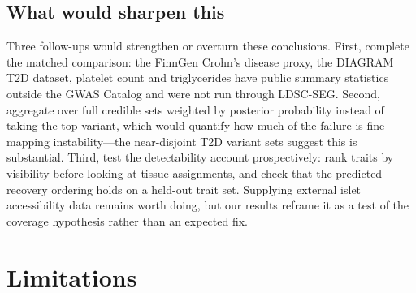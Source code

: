 \documentclass[11pt]{article}
\begin{document}
\subsection*{What would sharpen this}

Three follow-ups would strengthen or overturn these conclusions. First, complete the
matched comparison: the FinnGen Crohn's disease proxy, the DIAGRAM T2D dataset, platelet
count and triglycerides have public summary statistics outside the GWAS Catalog and were
not run through LDSC-SEG. Second,
aggregate over full credible sets weighted by posterior probability instead of taking
the top variant, which would quantify how much of the failure is fine-mapping
instability---the near-disjoint T2D variant sets suggest this is substantial. Third,
test the detectability account prospectively: rank traits by visibility before looking
at tissue assignments, and check that the predicted recovery ordering holds on a held-out
trait set. Supplying external islet accessibility data \citep{chiou2021islet} remains
worth doing, but our results reframe it as a test of the coverage hypothesis rather than
an expected fix.

\section{Limitations}
\end{document}

